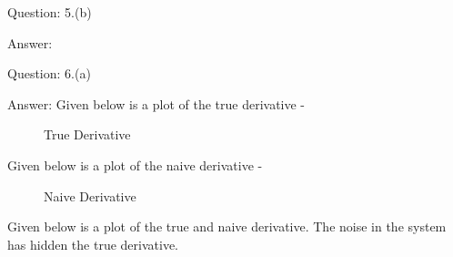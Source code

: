 \documentclass[a4paper]{article}
\begin{document}
\begin{qalist}
		\item[Question: 5.(b)] \setcounter{equation}{0}
		\item[Answer:] 	
		
		\item[Question: 6.(a)] \setcounter{equation}{0}
		\item[Answer:] 	Given below is a plot of the true derivative - 
			\begin{figure}[H]			
				\vspace{0.5cm}
				\centering
				\caption{True Derivative} 
				\label{fig:q6_a_1}
				\vspace{0.5cm}
			\end{figure}
			Given below is a plot of the naive derivative - 
			\begin{figure}[H]			
				\vspace{0.5cm}
				\centering
				\caption{Naive Derivative} 
				\label{fig:q6_a_2}
				\vspace{0.5cm}
			\end{figure}
			Given below is a plot of the true and naive derivative. The noise in the system has hidden the true derivative.
			\begin{figure}[H]			
				\vspace{0.5cm}
				\centering

\end{figure}
\end{qalist}
\end{document}

